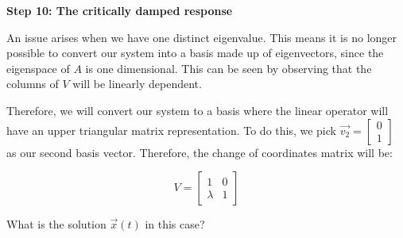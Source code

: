 \qitem \textbf{Step 10: The critically damped response}


An issue arises when we have one distinct eigenvalue. This means it is no longer possible to convert our system into a basis made up of eigenvectors, since the eigenspace of $A$ is one dimensional. This can be seen by observing that the columns of $V$ will be linearly dependent. 

Therefore, we will convert our system to a basis where the linear operator will have an upper triangular matrix representation. To do this, we pick $\vec{v_2} = \begin{bmatrix} 0 \\ 1 \end{bmatrix}$ as our second basis vector. Therefore, 
the change of coordinates matrix will be:

$$ V = \begin{bmatrix} 1 & 0 \\ \lambda & 1 \end{bmatrix} $$

What is the solution $\vec{x}(t)$ in this case?


